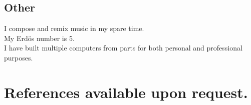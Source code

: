 \documentclass{res}
\begin{document}
\begin{resume}


\section{Other}
I compose and remix music in my spare time. \\
My Erd\"{o}s number is 5.\\
I have built multiple computers from parts for both personal and professional purposes.



\end{resume} 
\section{References available upon request.}
\end{document}
